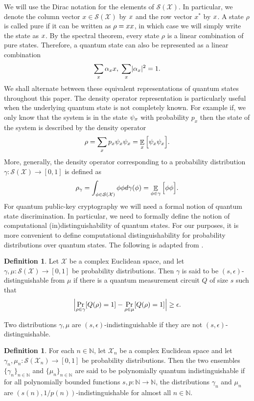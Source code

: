\documentclass[11pt]{article}
\theoremstyle{plain}
\theoremstyle{definition}
\newtheorem{definition}[theorem]{Definition}
\DeclareMathOperator{\E}{\mathbb{E}}
\DeclarePairedDelimiter{\abs}{\lvert}{\rvert}
\let\ket\relax
\DeclarePairedDelimiter{\ket}{\lvert}{\rangle}
\let\bra\relax
\DeclarePairedDelimiter{\bra}{\langle}{\rvert}
\def\N{\mathbb{N}}
\def\X{\mathcal{X}}
\def\SX{\mathcal{S(X)}}
\begin{document}
We will use the Dirac notation for the elements of $\SX$. In particular, we denote the column vector $x \in \SX$ by $\ket{x}$ and the row vector $x^*$ by $\bra{x}$. A state $\rho$ is called pure if it can be written as $\rho = \ket{x}\bra{x}$, in which case we will simply write the state as $\ket{x}$. By the spectral theorem, every state $\rho$ is a linear combination of pure states. Therefore, a quantum state can also be represented as a linear combination
\[ \sum_{x} \alpha_x \ket{x}, \hspace*{1mm} \sum_{x} \abs{\alpha_x}^2 = 1. \]
We shall alternate between these equivalent representations of quantum states throughout this paper. The density operator representation is particularly useful when the underlying quantum state is not completely known. For example if, we only know that the system is in the state $\ket{\psi_x}$ with probability $p_x$ then the state of the system is described by the density operator
\[ \rho = \sum_{x} p_x \ket{\psi_x}\bra{\psi_x} = \E_x \Big[ \ket{\psi_x} \bra{\psi_x} \Big]. \]
More, generally, the density operator corresponding to a probability distribution $\gamma: \SX \rightarrow [0, 1]$ is defined as
\[ \rho_\gamma = \int_{\ket{\phi} \in \SX} \ket{\phi}\bra{\phi} d\gamma(\ket{\phi}) = \E_{\ket{\phi} \in \gamma} \Big[ \ket{\phi}\bra{\phi} \Big]. \]
For quantum public-key cryptography we will need a formal notion of quantum state discrimination. In particular, we need to formally define the notion of computational (in)distinguishability of quantum states. For our purposes, it is more convenient to define computational distinguishability for probability distributions over quantum states. The following is adapted from \cite[\S 3.3]{watrous2009zero}.

\begin{definition}
    Let $\X$ be a complex Euclidean space, and let $\gamma, \mu: \SX \rightarrow [0, 1]$ be probability distributions. Then $\gamma$ is said to be $(s, \epsilon)$-distinguishable from $\mu$ if there is a quantum measurement circuit $Q$ of size $s$ such that
    \[ \abs[\Big]{ \Pr_{\rho \in \gamma}[Q(\rho) = 1] - \Pr_{\rho \in \mu}[Q(\rho) = 1]} \ge \epsilon. \]
\end{definition} 

Two distributions $\gamma, \mu$ are $(s, \epsilon)$-indistinguishable if they are not $(s, \epsilon)$-distinguishable.

\begin{definition}
    For each $n \in \N$, let $\X_n$ be a complex Euclidean space and let $\gamma_n, \mu_n: \mathcal{S}(\X_n) \rightarrow [0, 1]$ be probability distributions. Then the two ensembles $\{ \gamma_n \}_{n \in \N}$ and $\{ \mu_n \}_{n \in \N}$ are said to be polynomially quantum indistinguishable if for all polynomially bounded functions $s, p: \N \rightarrow \N$, the distributions $\gamma_n$ and $\mu_n$ are $(s(n), 1 / p(n))$-indistinguishable for almost all $n \in \N$.
\end{definition}
\end{document}

